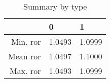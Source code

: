 \begin{table}[ht]
\centering
\begin{tabular}{rll}
  \hline
 & 0 & 1 \\ 
  \hline
Min. ror & 1.0493 & 1.0999 \\ 
  Mean ror & 1.0497 & 1.1000 \\ 
  Max. ror & 1.0493 & 1.0999 \\ 
   \hline
\end{tabular}
\caption{Summary by type } 
\label{tab:summ_by_type}
\end{table}
